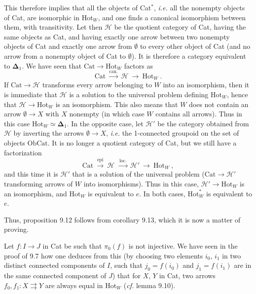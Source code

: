 \documentclass[11pt]{article}
\newcommand{\printedpage}[1]{\marginpar{\footnotesize p.~#1}}
\newcommand{\msp}[1]{\marginpar{\footnotesize [#1]}}
\newcommand{\Hot}{\mathrm{Hot}}
\newcommand{\Cat}{\mathrm{Cat}}
\newcommand{\Ob}{\mathrm{Ob}}
\begin{document}
This therefore implies that all the objects of Cat$^*$, \textit{i.e.} all the nonempty objects of Cat, are isomorphic in $\Hot_W$, and one finds a canonical isomorphism between them, with transitivity. Let then $\mathcal{H}$ be the quotient category of Cat, having the same objects as Cat, and having exactly one arrow between two nonempty objects of Cat and exactly one arrow from $\emptyset$ to every other object of Cat (and no arrow from a nonempty object of Cat to $\emptyset$). It is therefore a category equivalent to $\boldsymbol{\Delta}_1$. We have seen that $\Cat\longrightarrow\Hot_W$ factors as
\[
\Cat\ \xrightarrow{\text{can.}}\ \mathcal{H}\ \longrightarrow\ \Hot_W\ .
\]
If $\Cat\longrightarrow\mathcal{H}$ transforms every arrow belonging to $W$ into an isomorphism, then it is immediate that $\mathcal{H}$ is a solution to the universal problem defining $\Hot_W$, hence that $\mathcal{H}\longrightarrow\Hot_W$ is an isomorphism. This also means that $W$ does not contain an arrow $\emptyset\longrightarrow X$ with $X$ nonempty (in which case $W$ contains all arrows). Thus in this case $\Hot_W\simeq\boldsymbol{\Delta}_1$. In the opposite case, let $\mathcal{H}'$ be the category obtained from $\mathcal{H}$ by inverting the arrows $\emptyset\longrightarrow X$, \textit{i.e.} the 1-connected groupoid on the set of objects $\Ob\Cat$. It is no longer a quotient category of Cat, but we still have a factorization
\[
\Cat\ \xrightarrow{\text{epi}}\ \mathcal{H}\ \ \xrightarrow{\text{loc.}}\ \mathcal{H}'\ \longrightarrow\ \Hot_W\ ,
\]
\printedpage{73}
\msp{page 133 quater}and this time it is $\mathcal{H}'$ that is a solution of the universal problem ($\Cat\longrightarrow\mathcal{H}'$ transforming arrows of $W$ into isomorphisms). Thus in this case, $\mathcal{H}'\longrightarrow\Hot_W$ is an isomorphism, and $\Hot_W$ is equivalent to $e$. In both cases, $\Hot_W^*$ is equivalent to $e$.

Thus, proposition 9.12 follows from corollary 9.13, which it is now a matter of proving.

Let $f:I\longrightarrow J$ in Cat be such that $\pi_0(f)$ is not injective. We have seen in the proof of 9.7 how one deduces from this (by choosing two elements $i_0$, $i_1$ in two distinct connected components of $I$, such that $j_0=f(i_0)$ and $j_1=f(i_1)$ are in the same connected component of $J$) that for $X$, $Y$ in Cat, two arrows $f_0,f_1:X\rightrightarrows Y$ are always equal in $\Hot_W$ (\textit{cf.} lemma 9.10).
\end{document}

